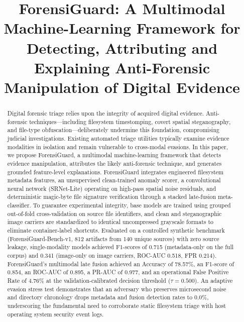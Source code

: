 \documentclass[conference]{IEEEtran}
\begin{document}
\title{ForensiGuard: A Multimodal Machine-Learning Framework for Detecting, Attributing and Explaining Anti-Forensic Manipulation of Digital Evidence}

\author{
\and
{}
}

\maketitle

\begin{abstract}
Digital forensic triage relies upon the integrity of acquired digital evidence. Anti-forensic techniques---including filesystem timestomping, covert spatial steganography, and file-type obfuscation---deliberately undermine this foundation, compromising judicial investigations. Existing automated triage utilities typically examine evidence modalities in isolation and remain vulnerable to cross-modal evasions. In this paper, we propose ForensiGuard, a multimodal machine-learning framework that detects evidence manipulation, attributes the likely anti-forensic technique, and generates grounded feature-level explanations. ForensiGuard integrates engineered filesystem metadata features, an unsupervised clean-trained anomaly scorer, a convolutional neural network (SRNet-Lite) operating on high-pass spatial noise residuals, and deterministic magic-byte file signature verification through a stacked late-fusion meta-classifier. To guarantee experimental integrity, base models are trained using grouped out-of-fold cross-validation on source file identifiers, and clean and steganographic image carriers are standardized to identical uncompressed grayscale formats to eliminate container-label shortcuts. Evaluated on a controlled synthetic benchmark (ForensiGuard-Bench-v1, 812 artifacts from 140 unique sources) with zero source leakage, single-modality models achieved F1-scores of 0.715 (metadata-only on the full corpus) and 0.341 (image-only on image carriers, ROC-AUC 0.518, FPR 0.214). ForensiGuard's multimodal late fusion achieved an Accuracy of 78.57\%, an F1-score of 0.854, an ROC-AUC of 0.895, a PR-AUC of 0.977, and an operational False Positive Rate of 4.76\% at the validation-calibrated decision threshold ($\tau = 0.500$). An adaptive evasion stress test demonstrates that an adversary who preserves microsecond noise and directory chronology drops metadata and fusion detection rates to 0.0\%, underscoring the fundamental need to corroborate static filesystem triage with host operating system security event logs.
\end{abstract}
\end{document}
